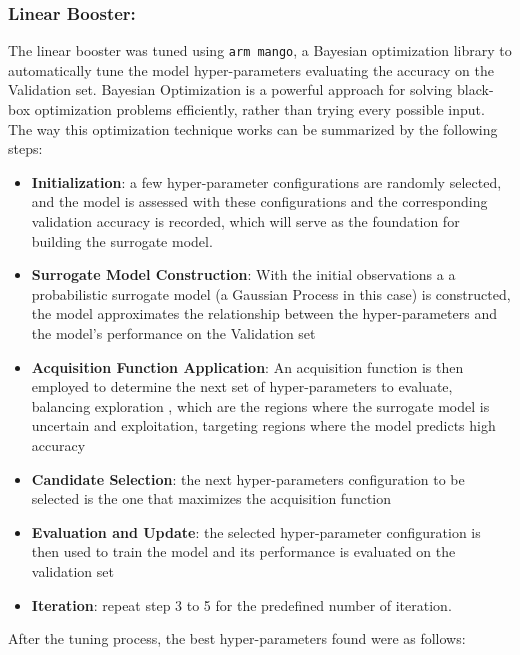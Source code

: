 \subsubsection{Linear Booster:}
The linear booster was tuned using \texttt{arm mango}, a Bayesian optimization library to automatically tune the model hyper-parameters evaluating the accuracy on the Validation set. Bayesian Optimization is a powerful approach for solving black-box optimization problems efficiently, rather than trying every possible input. The way this optimization technique works can be summarized by the following steps: 
\begin{itemize}
    \item \textbf{Initialization}: a few hyper-parameter configurations are randomly selected,  and the model is assessed with these configurations and the corresponding validation accuracy is recorded, which will serve as the foundation for building the surrogate model.
    \item \textbf{Surrogate Model Construction}: With the initial observations a  a probabilistic surrogate model (a Gaussian Process in this case) is constructed, the model approximates the relationship between the hyper-parameters and the model's performance on the Validation set
    \item \textbf{Acquisition Function Application}: An acquisition function is then employed to determine the next set of hyper-parameters to evaluate, balancing exploration , which are the regions where the surrogate model is uncertain and exploitation, targeting regions where the model predicts high accuracy
    \item \textbf{Candidate Selection}: the next hyper-parameters configuration to be selected is the one that maximizes the acquisition function
    \item \textbf{Evaluation and Update}: the selected hyper-parameter configuration is then used to train the model and its performance is evaluated on the validation set
    \item \textbf{Iteration}: repeat step 3 to 5 for the predefined number of iteration. 
\end{itemize}
After the tuning process, the best hyper-parameters found were as follows:

